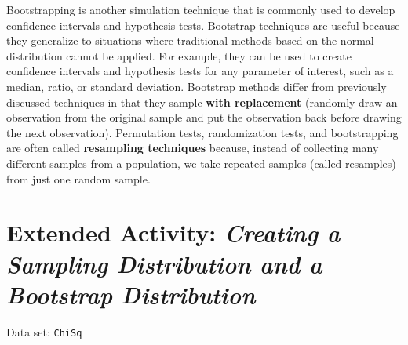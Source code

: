 \documentclass[
]{report}
\theoremstyle{definition}
\theoremstyle{definition}
\theoremstyle{definition}
\theoremstyle{definition}
\theoremstyle{remark}
\begin{document}
Bootstrapping is another simulation technique that is commonly used to develop confidence intervals and
hypothesis tests. Bootstrap techniques are useful because they generalize to situations where traditional methods
based on the normal distribution cannot be applied. For example, they can be used to create confidence intervals
and hypothesis tests for any parameter of interest, such as a median, ratio, or standard deviation. Bootstrap
methods differ from previously discussed techniques in that they sample \textbf{with replacement} (randomly draw
an observation from the original sample and put the observation back before drawing the next observation).
\textbar{} Permutation tests, randomization tests, and bootstrapping are often called \textbf{resampling techniques}
because, instead of collecting many different samples from a population, we take repeated samples (called
resamples) from just one random sample.

\hypertarget{extended-activity-creating-a-sampling-distribution-and-a-bootstrap-distribution}{%
\section*{\texorpdfstring{Extended Activity: \emph{Creating a Sampling Distribution and a Bootstrap Distribution}}{Extended Activity: Creating a Sampling Distribution and a Bootstrap Distribution}}\label{extended-activity-creating-a-sampling-distribution-and-a-bootstrap-distribution}}

Data set: \texttt{ChiSq}
\end{document}
